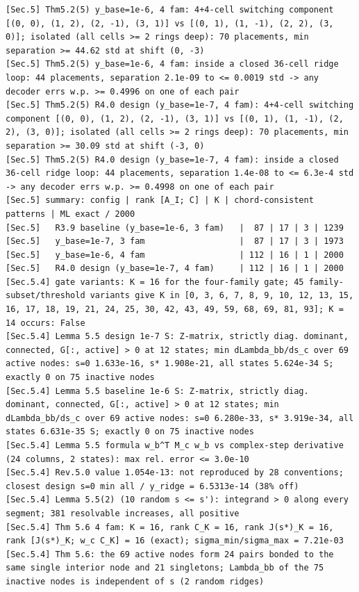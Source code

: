\documentclass[11pt,a4paper]{article}
\theoremstyle{definition}
\theoremstyle{remark}
\begin{document}
\begin{lstlisting}[style=consolestyle]
[Sec.5] Thm5.2(5) y_base=1e-6, 4 fam: 4+4-cell switching component [(0, 0), (1, 2), (2, -1), (3, 1)] vs [(0, 1), (1, -1), (2, 2), (3, 0)]; isolated (all cells >= 2 rings deep): 70 placements, min separation >= 44.62 std at shift (0, -3)
[Sec.5] Thm5.2(5) y_base=1e-6, 4 fam: inside a closed 36-cell ridge loop: 44 placements, separation 2.1e-09 to <= 0.0019 std -> any decoder errs w.p. >= 0.4996 on one of each pair
[Sec.5] Thm5.2(5) R4.0 design (y_base=1e-7, 4 fam): 4+4-cell switching component [(0, 0), (1, 2), (2, -1), (3, 1)] vs [(0, 1), (1, -1), (2, 2), (3, 0)]; isolated (all cells >= 2 rings deep): 70 placements, min separation >= 30.09 std at shift (-3, 0)
[Sec.5] Thm5.2(5) R4.0 design (y_base=1e-7, 4 fam): inside a closed 36-cell ridge loop: 44 placements, separation 1.4e-08 to <= 6.3e-4 std -> any decoder errs w.p. >= 0.4998 on one of each pair
[Sec.5] summary: config | rank [A_I; C] | K | chord-consistent patterns | ML exact / 2000
[Sec.5]   R3.9 baseline (y_base=1e-6, 3 fam)   |  87 | 17 | 3 | 1239
[Sec.5]   y_base=1e-7, 3 fam                   |  87 | 17 | 3 | 1973
[Sec.5]   y_base=1e-6, 4 fam                   | 112 | 16 | 1 | 2000
[Sec.5]   R4.0 design (y_base=1e-7, 4 fam)     | 112 | 16 | 1 | 2000
[Sec.5.4] gate variants: K = 16 for the four-family gate; 45 family-subset/threshold variants give K in [0, 3, 6, 7, 8, 9, 10, 12, 13, 15, 16, 17, 18, 19, 21, 24, 25, 30, 42, 43, 49, 59, 68, 69, 81, 93]; K = 14 occurs: False
[Sec.5.4] Lemma 5.5 design 1e-7 S: Z-matrix, strictly diag. dominant, connected, G[:, active] > 0 at 12 states; min dLambda_bb/ds_c over 69 active nodes: s=0 1.633e-16, s* 1.908e-21, all states 5.624e-34 S; exactly 0 on 75 inactive nodes
[Sec.5.4] Lemma 5.5 baseline 1e-6 S: Z-matrix, strictly diag. dominant, connected, G[:, active] > 0 at 12 states; min dLambda_bb/ds_c over 69 active nodes: s=0 6.280e-33, s* 3.919e-34, all states 6.631e-35 S; exactly 0 on 75 inactive nodes
[Sec.5.4] Lemma 5.5 formula w_b^T M_c w_b vs complex-step derivative (24 columns, 2 states): max rel. error <= 3.0e-10
[Sec.5.4] Rev.5.0 value 1.054e-13: not reproduced by 28 conventions; closest design s=0 min all / y_ridge = 6.5313e-14 (38% off)
[Sec.5.4] Lemma 5.5(2) (10 random s <= s'): integrand > 0 along every segment; 381 resolvable increases, all positive
[Sec.5.4] Thm 5.6 4 fam: K = 16, rank C_K = 16, rank J(s*)_K = 16, rank [J(s*)_K; w_c C_K] = 16 (exact); sigma_min/sigma_max = 7.21e-03
[Sec.5.4] Thm 5.6: the 69 active nodes form 24 pairs bonded to the same single interior node and 21 singletons; Lambda_bb of the 75 inactive nodes is independent of s (2 random ridges)

\end{lstlisting}
\end{document}
